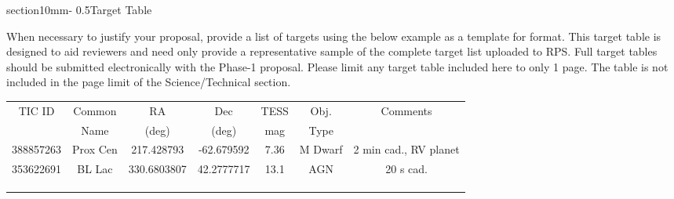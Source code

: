 \documentclass[letterpaper,12pt]{article}
\makeatletter
\renewcommand{\section}{\@startsection%
{section}{1}{0mm}{-\baselineskip}%
{0.5\baselineskip}{\normalfont\Large\bfseries}}%
\makeatother
\begin{document}
\clearpage

{}




\section{Target Table}

When necessary to justify your proposal, provide a list of targets using the below example as a template for format. This target table is designed to aid reviewers and need only provide a representative sample of the complete target list uploaded to RPS. Full target tables should be submitted electronically with the Phase-1 proposal. Please limit any target table included here to only 1 page. The table is not included in the page limit of the Science/Technical section. 


\begin{center}
\begin{tabular}{ | c | c | c | c | c | c | c | }
\hline
TIC ID          &      Common      &     RA             &      Dec          &      TESS       &       Obj.        &      Comments \\       
                    &      Name           &     (deg)          &      (deg)        &      mag         &       Type       &                         \\     
\hline
\hline
388857263  &  Prox Cen           &  217.428793  &  -62.679592  &  7.36             &    M Dwarf    & 2 min cad., RV planet \\ \hline
353622691  &  BL Lac               &   330.6803807    &   42.2777717    &   13.1  &   AGN            &    20 s cad.                                 \\ \hline
                    &                           &                       &                      &                      &                     &                                     \\ \hline
                    &                           &                       &                      &                      &                     &                                     \\ \hline
                    &                           &                       &                      &                      &                     &                                     \\ \hline
\end{tabular}
\end{center}   

\end{document}
